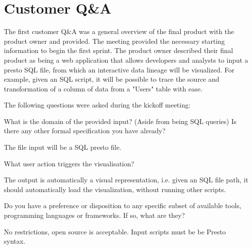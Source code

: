 
\section{Customer Q\&A}
\begin{spacing}{1.3}
The first customer Q\&A was a general overview of the final product with the product owner and provided. The meeting provided the necessary starting information to begin the first sprint. The product owner described their final product as being a web application that allows developers and analysts to input a presto SQL file, from which an interactive data lineage will be visualized. For example, given an SQL script, it will be possible to trace the source and transformation of a column of data from a "Users" table with ease. \\ \vspace{-5pt}

The following questions were asked during the kickoff meeting:
\begin{QandA}
   \item What is the domain of the provided input? (Aside from being SQL queries) Is there any other formal specification you have already?
        \begin{answered}
            The file input will be a SQL presto file.
        \end{answered}

   \item What user action triggers the visualisation?
         \begin{answered}
            The output is automatically a visual representation, i.e. given an SQL file path, it should automatically load the visualization, without running other scripts.
         \end{answered}
         
    \item Do you have a preference or disposition to any specific subset of available tools, programming languages or frameworks. If so, what are they?
        \begin{answered}
            No restrictions, open source is acceptable. Input scripts must be be Presto syntax.
        \end{answered}
        

\end{QandA}
\end{spacing}
